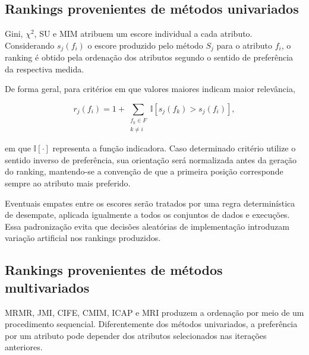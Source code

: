 \subsection{Rankings provenientes de métodos univariados}
\label{subsec:ac-efs-univariados}

Gini, $\chi^2$, SU e MIM atribuem um escore individual a cada atributo.
Considerando $s_j(f_i)$ o escore produzido pelo método $S_j$ para o atributo
$f_i$, o ranking é obtido pela ordenação dos atributos segundo o sentido de
preferência da respectiva medida.

De forma geral, para critérios em que valores maiores indicam maior relevância,

\begin{equation}
    r_j(f_i)
    =
    1+
    \sum_{\substack{f_k\in F\\k\neq i}}
    \mathbb{I}
    \left[
        s_j(f_k)>s_j(f_i)
    \right],
    \label{eq:ranking-score-ac-efs}
\end{equation}

em que $\mathbb{I}[\cdot]$ representa a função indicadora. Caso determinado
critério utilize o sentido inverso de preferência, sua orientação será
normalizada antes da geração do ranking, mantendo-se a convenção de que a
primeira posição corresponde sempre ao atributo mais preferido.

Eventuais empates entre os escores serão tratados por uma regra determinística
de desempate, aplicada igualmente a todos os conjuntos de dados e execuções.
Essa padronização evita que decisões aleatórias de implementação introduzam
variação artificial nos rankings produzidos.


\subsection{Rankings provenientes de métodos multivariados}
\label{subsec:ac-efs-multivariados}

MRMR, JMI, CIFE, CMIM, ICAP e MRI produzem a ordenação por meio de um
procedimento sequencial. Diferentemente dos métodos univariados, a preferência
por um atributo pode depender dos atributos selecionados nas iterações
anteriores.

